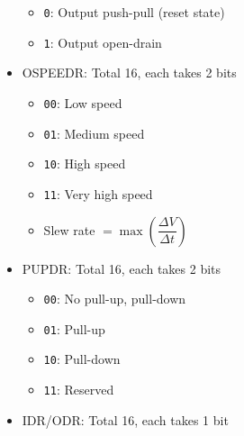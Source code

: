 \documentclass[a4paper,12pt,openany]{book}
\begin{document}
\begin{itemize}
    \begin{itemize}
        \item \texttt{0}: Output push-pull (reset state)
        \item \texttt{1}: Output open-drain
    \end{itemize}
    \item OSPEEDR: Total 16, each takes 2 bits
    \begin{itemize}
        \item \texttt{00}: Low speed
        \item \texttt{01}: Medium speed
        \item \texttt{10}: High speed
        \item \texttt{11}: Very high speed
        \item Slew rate $=\max\left(\dfrac{\Delta V}{\Delta t}\right)$
    \end{itemize}
    \item PUPDR: Total 16, each takes 2 bits
    \begin{itemize}
        \item \texttt{00}: No pull-up, pull-down
        \item \texttt{01}: Pull-up
        \item \texttt{10}: Pull-down
        \item \texttt{11}: Reserved
    \end{itemize}
    \item IDR/ODR: Total 16, each takes 1 bit
\end{itemize}
\end{document}
